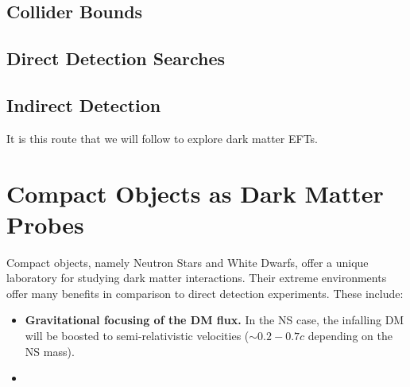 \subsection{Collider Bounds}

\subsection{Direct Detection Searches}

\subsection{Indirect Detection}


It is this route that we will follow to explore dark matter EFTs.

\section{Compact Objects as Dark Matter Probes}


Compact objects, namely Neutron Stars and White Dwarfs, offer a unique
laboratory for studying dark matter interactions. Their extreme environments
offer many benefits in comparison to direct detection experiments. 
These include:

\begin{itemize}
\item \textbf{Gravitational focusing of the DM flux.} In the NS case, the 
infalling DM will be boosted to semi-relativistic velocities ($\sim 0.2 - 0.7 c$
depending on the NS mass).
\item 
\end{itemize}







